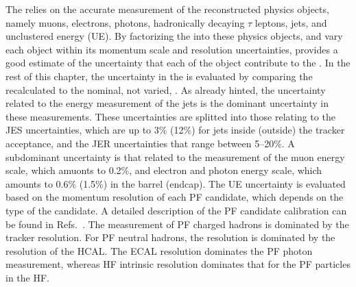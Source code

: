 The \ptmiss relies on the accurate measurement of the reconstructed physics objects, namely muons, electrons, photons, hadronically decaying $\tau$ leptons, jets, and unclustered energy (UE). 
By factorizing the \ptmiss into these physics objects, and vary each object within its momentum scale and resolution uncertainties, provides a good estimate of the uncertainty that each of the object contribute to the \ptmiss. 
In the rest of this chapter, the uncertainty in the \ptmiss is evaluated by comparing the recalculated \ptmiss to the nominal, not varied, \ptmiss. 
As already hinted, the uncertainty related to the energy measurement of the jets is the dominant uncertainty in these measurements. 
These uncertainties are splitted into those relating to the JES uncertainties, which are up to 3\% (12\%) for jets inside (outside) the tracker acceptance, and the JER uncertainties that range between 5--20\%. 
A subdominant uncertainty is that related to the measurement of the muon energy scale, which amuonts to 0.2\%, and electron and photon energy scale, which amounts to 0.6\% (1.5\%) in the barrel (endcap). 
The UE uncertainty is evaluated based on the momentum resolution of each PF candidate, which depends on the type of the candidate. 
A detailed description of the PF candidate calibration can be found in Refs.~\cite{Sirunyan:2017ulk,Chatrchyan:2014fea,Khachatryan:2015iwa}.  
The \pt measurement of PF charged hadrons is dominated by the tracker resolution. 
For PF neutral hadrons, the \pt resolution is dominated by the resolution of the HCAL. 
The ECAL resolution dominates the PF photon \pt measurement, whereas HF intrinsic resolution dominates that for the PF particles in the HF. 
